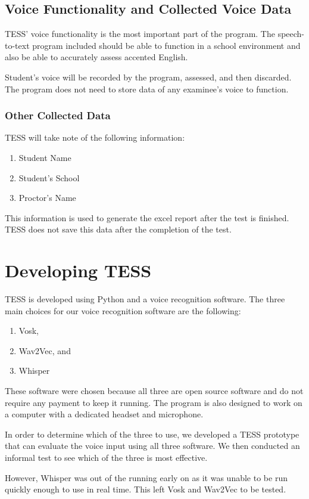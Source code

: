 \subsection{Voice Functionality and Collected Voice Data}
TESS’ voice functionality is the most important part of the program. The speech-to-text program included should be able to function in a school environment and also be able to accurately assess accented English.

Student’s voice will be recorded by the program, assessed, and then discarded. The program does not need to store data of any examinee’s voice to function.

\subsubsection{Other Collected Data}
TESS will take note of the following information:
\begin{enumerate}
\item Student Name
\item Student’s School
\item Proctor’s Name
\end{enumerate}
This information is used to generate the excel report after the test is finished. TESS does not save this data after the completion of the test.

\section{Developing TESS}
TESS is developed using Python and a voice recognition software.
The three main choices for our voice recognition software are the following:
\begin{enumerate}
\item Vosk,
\item Wav2Vec, and
\item Whisper
\end{enumerate}
These software were chosen because all three are open source software and do not require any payment to keep it running.
The program is also designed to work on a computer with a dedicated headset and microphone.

In order to determine which of the three to use, we developed a TESS prototype that can evaluate the voice input using all three software. We then conducted an informal test to see which of the three is most effective.

However, Whisper was out of the running early on as it was unable to be run quickly enough to use in real time. This left Vosk and Wav2Vec to be tested.

